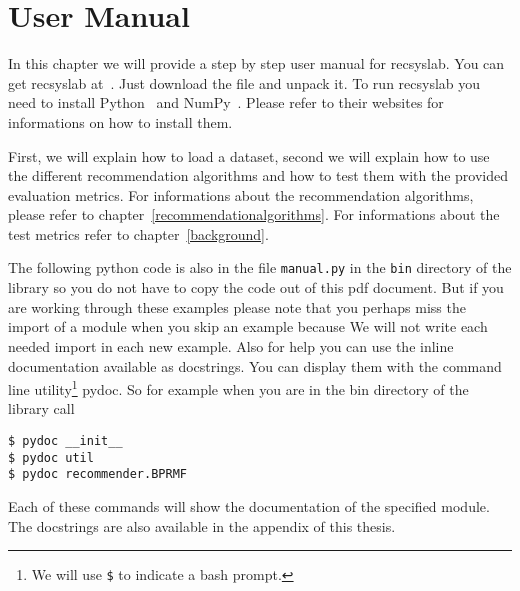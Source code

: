 \chapter{User Manual}
\label{usermanual}
In this chapter we will provide a step by step user manual for recsyslab.
You can get recsyslab at~\cite{downloadrecsyslab}. Just download the file 
and unpack it.
To run recsyslab you need to install Python~\cite{python} and NumPy~\cite{numpy}.
Please refer to their websites for informations on how to install them.

First, we will explain how to load a dataset, second we
will explain how to use the different recommendation algorithms and
how to test them with the provided evaluation metrics. 
For informations about the recommendation algorithms, please refer to chapter~\ref{recommendationalgorithms}.
For informations about the test metrics refer to chapter~\ref{background}.

The following python code is also in the file \lstinline!manual.py! in the \lstinline!bin! directory of the library
so you do not have to copy the code out of this pdf document. But if you are working through these examples
please note that you perhaps miss the import of a module when you skip an example because
We will not write each needed import in each new example.
Also for help you can use the inline documentation available as docstrings.
You can display them with the command line utility\footnote{We will use \lstinline!$! to indicate a bash prompt.} pydoc.
So for example when you are in the bin directory of the library call

\begin{lstlisting}
$ pydoc __init__
$ pydoc util 
$ pydoc recommender.BPRMF
\end{lstlisting}
Each of these commands will show the documentation of the specified module.
The docstrings are also available in the appendix of this thesis.


